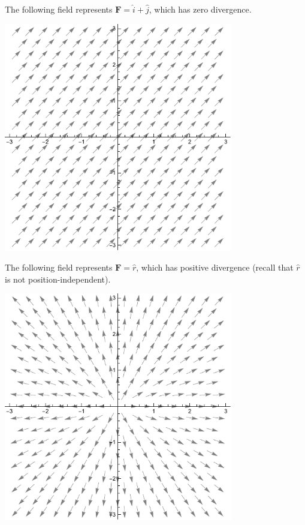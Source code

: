 \documentclass[10pt]{mypackage}
\begin{document}
\begin{example}
  The following field represents $\mathbf{F} = \widehat{i} + \widehat{j}$, which has zero divergence.
  \begin{center}
    \includegraphics[width=10cm]{images/div0field.pdf}
  \end{center}
  The following field represents $\mathbf{F} = \widehat{r}$, which has positive divergence (recall that $\widehat{r}$ is not position-independent).
  \begin{center}
    \includegraphics[width=10cm]{images/spreadfield.pdf}
  \end{center}
\end{example}
\end{document}
